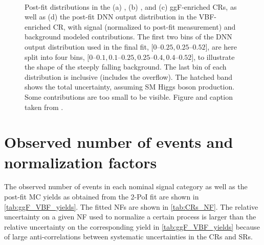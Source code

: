     \begin{figure}[htp]
        \centering
         \\
        \caption{
            Post-fit \mT distributions in the (a) \ZeroJet, (b) \OneJet, and (c) ggF-enriched \TwoJet \Ztt CRs, as well as (d) the post-fit DNN output distribution in the VBF-enriched \TwoJet \Ztt CR, with signal (normalized to post-fit measurement) and background modeled contributions.
            The first two bins of the DNN output distribution used in the final fit, $[0$--$0.25,0.25$--$0.52]$, are here split into four bins, $[0$--$0.1,0.1$--$0.25,0.25$--$0.4,0.4$--$0.52]$, to illustrate the shape of the steeply falling background.
            The last bin of each \mT distribution is inclusive (includes the overflow).
            The hatched band shows the total uncertainty, assuming SM Higgs boson production.
            Some contributions are too small to be visible.
            Figure and caption taken from .
            \label{fig:Ztt_CRs}
        }
    \end{figure}

    \clearpage
    \FloatBarrier
    \section{Observed number of events and normalization factors}

    The observed number of events in each nominal signal category as well as the post-fit MC yields as obtained from the 2-PoI fit are shown in \cref{tab:ggF_VBF_yields}.
    The fitted NFs are shown in \cref{tab:CRs_NF}.
    The relative uncertainty on a given NF used to normalize a certain process is larger than the relative uncertainty on the corresponding yield in \cref{tab:ggF_VBF_yields} because of large anti-correlations between systematic uncertainties in the CRs and SRs.

